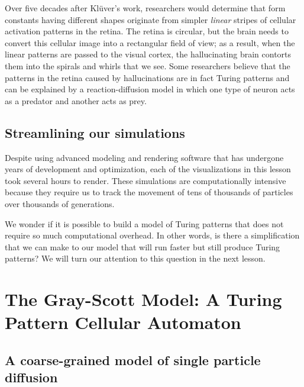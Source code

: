 {Over five decades after Klüver's work, researchers would determine that form constants having different shapes originate from simpler \textit{linear} stripes of cellular activation patterns in the retina. The retina is circular, but the brain needs to convert this cellular image into a rectangular field of view; as a result, when the linear patterns are passed to the visual cortex, the hallucinating brain contorts them into the spirals and whirls that we see. Some researchers believe that the patterns in the retina caused by hallucinations are in fact Turing patterns and can be explained by a reaction-diffusion model in which one type of neuron acts as a predator and another acts as prey.

\FloatBarrier
{}
\subsection{Streamlining our simulations}

Despite using advanced modeling and rendering software that has undergone years of development and optimization, each of the visualizations in this lesson took several hours to render. These simulations are computationally intensive because they require us to track the movement of tens of thousands of particles over thousands of generations.

We wonder if it is possible to build a model of Turing patterns that does not require so much computational overhead. In other words, is there a simplification that we can make to our model that will run faster but still produce Turing patterns? We will turn our attention to this question in the next lesson.





















\FloatBarrier
{}

\section{The Gray-Scott Model: A Turing Pattern Cellular Automaton}
\label{sec:the_gray-scott_model:_a_turing_pattern_cellular_automaton}

\subsection{A coarse-grained model of single particle diffusion}


}

